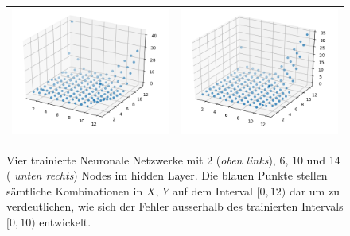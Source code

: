 \begin{figure}
\begin{tabular}{cc}
		\includegraphics[scale=0.4]{learning/img/abs_plot_10_clean.png} &
		\includegraphics[scale=0.4]{learning/img/abs_plot_14_clean.png} \\				
	\end{tabular}
	\label{fig:mst_multiplicator_error}
	\caption{Vier trainierte Neuronale Netzwerke mit 2 (\textit{oben links}), 6, 10 und 14 ( \textit{unten rechts}) Nodes im hidden Layer. Die blauen Punkte stellen sämtliche Kombinationen in $X$, $Y$ auf dem Interval $[0,12)$ dar um zu verdeutlichen, wie sich der Fehler ausserhalb des trainierten Intervals $[0,10)$ entwickelt.}
\end{figure}

